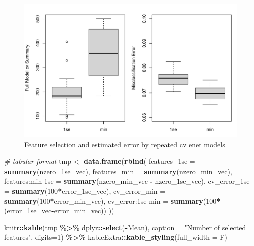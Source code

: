 \documentclass[
]{book}
\newenvironment{Shaded}{\begin{snugshade}}{\end{snugshade}}
\newcommand{\CommentTok}[1]{\textcolor[rgb]{0.56,0.35,0.01}{\textit{#1}}}
\newcommand{\DataTypeTok}[1]{\textcolor[rgb]{0.13,0.29,0.53}{#1}}
\newcommand{\DecValTok}[1]{\textcolor[rgb]{0.00,0.00,0.81}{#1}}
\newcommand{\KeywordTok}[1]{\textcolor[rgb]{0.13,0.29,0.53}{\textbf{#1}}}
\newcommand{\NormalTok}[1]{#1}
\newcommand{\OperatorTok}[1]{\textcolor[rgb]{0.81,0.36,0.00}{\textbf{#1}}}
\newcommand{\StringTok}[1]{\textcolor[rgb]{0.31,0.60,0.02}{#1}}
\begin{document}
\begin{figure}
\centering
\includegraphics{Static/figures/model-size-enetAll-1.pdf}
\caption{\label{fig:model-size-enetAll}Feature selection and estimated error by repeated cv enet models}
\end{figure}

\begin{Shaded}
\begin{Highlighting}[]
\CommentTok{\# tabular format}
\NormalTok{tmp <{-}}\StringTok{ }\KeywordTok{data.frame}\NormalTok{(}\KeywordTok{rbind}\NormalTok{(}
 \StringTok{\textasciigrave{}}\DataTypeTok{features\_1se}\StringTok{\textasciigrave{}}\NormalTok{ =}\StringTok{ }\KeywordTok{summary}\NormalTok{(nzero\_1se\_vec),}
 \DataTypeTok{features\_min =} \KeywordTok{summary}\NormalTok{(nzero\_min\_vec),}
 \StringTok{\textasciigrave{}}\DataTypeTok{features:min{-}1se}\StringTok{\textasciigrave{}}\NormalTok{ =}\StringTok{ }\KeywordTok{summary}\NormalTok{(nzero\_min\_vec }\OperatorTok{{-}}\StringTok{ }\NormalTok{nzero\_1se\_vec),}
 \StringTok{\textasciigrave{}}\DataTypeTok{cv\_error\_1se}\StringTok{\textasciigrave{}}\NormalTok{ =}\StringTok{ }\KeywordTok{summary}\NormalTok{(}\DecValTok{100}\OperatorTok{*}\NormalTok{error\_1se\_vec),}
 \DataTypeTok{cv\_error\_min =} \KeywordTok{summary}\NormalTok{(}\DecValTok{100}\OperatorTok{*}\NormalTok{error\_min\_vec),}
 \StringTok{\textasciigrave{}}\DataTypeTok{cv\_error:1se{-}min}\StringTok{\textasciigrave{}}\NormalTok{ =}\StringTok{ }\KeywordTok{summary}\NormalTok{(}\DecValTok{100}\OperatorTok{*}\NormalTok{(error\_1se\_vec}\OperatorTok{{-}}\NormalTok{error\_min\_vec))}
\NormalTok{))}

\NormalTok{knitr}\OperatorTok{::}\KeywordTok{kable}\NormalTok{(tmp }\OperatorTok{\%>\%}\StringTok{ }\NormalTok{dplyr}\OperatorTok{::}\KeywordTok{select}\NormalTok{(}\OperatorTok{{-}}\NormalTok{Mean),}
  \DataTypeTok{caption =} \StringTok{"Number of selected features"}\NormalTok{,}
  \DataTypeTok{digits=}\DecValTok{1}\NormalTok{) }\OperatorTok{\%>\%}
\StringTok{   }\NormalTok{kableExtra}\OperatorTok{::}\KeywordTok{kable\_styling}\NormalTok{(}\DataTypeTok{full\_width =}\NormalTok{ F)}
\end{Highlighting}
\end{Shaded}
\end{document}
